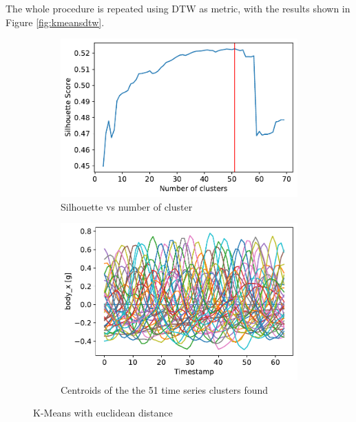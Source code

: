 \documentclass[10pt, a4paper, twocolumn]{article}
\begin{document}
The whole procedure is repeated using DTW as metric, with the results shown in Figure \ref{fig:kmeansdtw}.

\begin{figure}
    \centering
    \begin{subfigure}[t]{0.44\columnwidth}
    \includegraphics[width=\linewidth]{X_64_silhouette_euc.pdf}
    \caption{Silhouette vs number of cluster}
    \label{fig:sileuc}
    \end{subfigure}
    \begin{subfigure}[t]{0.45\columnwidth}
    \includegraphics[width=\linewidth]{X_64_41_cluster.pdf}
    \caption{Centroids of the the 51 time series clusters found}
    \label{fig:51cl}
    \end{subfigure}
    \caption{K-Means with euclidean distance}
    \label{fig:kmeanseuc}
\end{figure}
\end{document}
